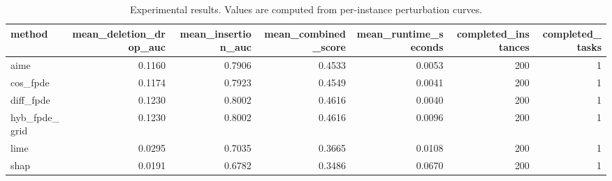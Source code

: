 \begin{table}[t]
\caption{Experimental results. Values are computed from per-instance perturbation curves.}
\label{tab:main_results_computed}
\centering
\begin{tabular}{lrrrrrr}
\toprule
method & mean\_deletion\_drop\_auc & mean\_insertion\_auc & mean\_combined\_score & mean\_runtime\_seconds & completed\_instances & completed\_tasks \\
\midrule
aime & 0.1160 & 0.7906 & 0.4533 & 0.0053 & 200 & 1 \\
cos\_fpde & 0.1174 & 0.7923 & 0.4549 & 0.0041 & 200 & 1 \\
diff\_fpde & 0.1230 & 0.8002 & 0.4616 & 0.0040 & 200 & 1 \\
hyb\_fpde\_grid & 0.1230 & 0.8002 & 0.4616 & 0.0096 & 200 & 1 \\
lime & 0.0295 & 0.7035 & 0.3665 & 0.0108 & 200 & 1 \\
shap & 0.0191 & 0.6782 & 0.3486 & 0.0670 & 200 & 1 \\
\bottomrule
\end{tabular}

\end{table}

